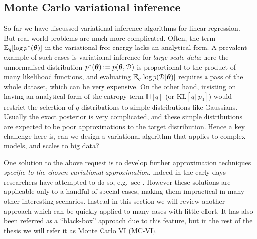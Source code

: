 \subsection{Monte Carlo variational inference}
\label{sec:chap2_mcvi}

So far we have discussed variational inference algorithms for linear regression. But real world problems are much more complicated. Often, the term $\mathbb{E}_q[\log p^*(\bm{\theta})]$ in the variational free energy lacks an analytical form. A prevalent example of such cases is variational inference for \emph{large-scale data}: here the unnormalised distribution $p^*(\bm{\theta}) := p(\bm{\theta}, \mathcal{D})$ is proportional to the product of many likelihood functions, and evaluating $\mathbb{E}_q[\log p(\mathcal{D} | \bm{\theta})]$ requires a pass of the whole dataset, which can be very expensive. On the other hand, insisting on having an analytical form of the entropy term $\mathbb{H}[q]$ (or $\mathrm{KL}[q||p_0]$) would restrict the selection of $q$ distributions to simple distributions like Gaussians. Usually the exact posterior is very complicated, and these simple distributions are expected to be poor approximations to the target distribution. Hence a key challenge here is, can we design a variational algorithm that applies to complex models, and scales to big data?

One solution to the above request is to develop further approximation techniques \emph{specific to the chosen variational approximation}. Indeed in the early days researchers have attempted to do so, e.g.~see \cite{jaakkola:gmm1998, gershman:nonparametric_vi2012}.  However these solutions are applicable only to a handful of special cases, making them impractical in many other interesting scenarios. Instead in this section we will review another approach which can be quickly applied to many cases with little effort.  It has also been referred as a ``black-box'' approach \citep{ranganath:bbvi2014} due to this feature, but in the rest of the thesis we will refer it as Monte Carlo VI (MC-VI). 

